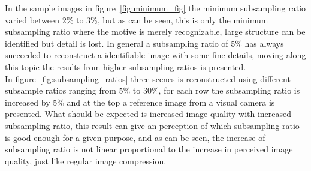 In the sample images in figure~\ref{fig:minimum_fig} the minimum subsampling ratio varied between 2\% to 3\%, but as can be seen, this is only the minimum subsampling ratio where the motive is merely recognizable, large structure can be identified but detail is lost. In general a subsampling ratio of 5\% has always succeeded to reconstruct a identifiable image with some fine details, moving along this topic the results from higher subsampling ratios is presented.\\[0.1in]

In figure~\ref{fig:subsampling_ratios} three scenes is reconstructed using different subsample ratios ranging from 5\% to 30\%, for each row the subsampling ratio is increased by 5\% and at the top a reference image from a visual camera is presented. What should be expected is increased image quality with increased subsampling ratio, this result can give an perception of which subsampling ratio is good enough for a given purpose, and as can be seen, the increase of subsampling ratio is not linear proportional to the increase in perceived image quality, just like regular image compression.
     

